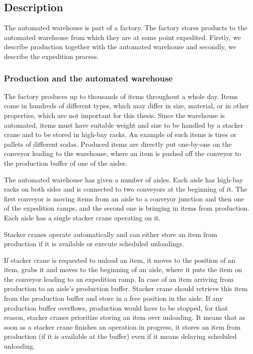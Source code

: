 \documentclass{ctuthesis}
\begin{document}
\subsection{Description}
\label{subsec:Description}
The automated warehouse is part of a factory. The factory stores products to the automated warehouse from which they are at some point expedited. Firstly, we describe production together with the automated warehouse and secondly, we describe the expedition process.

\subsubsection{Production and the automated warehouse}

The factory produces up to thousands of items throughout a whole day. Items come in hundreds of different types, which may differ in size, material, or in other properties, which are not important for this thesis. Since the warehouse is automated, items must have suitable weight and size to be handled by a stacker crane and to be stored in high-bay racks. An example of such items is tires or pallets of different sodas. Produced items are directly put one-by-one on the conveyor leading to the warehouse, where an item is pushed off the conveyor to the production buffer of one of the aisles.

The automated warehouse has given a number of aisles. Each aisle has high-bay racks on both sides and is connected to two conveyors at the beginning of it. The first conveyor is moving items from an aisle to a conveyor junction and then one of the expedition ramps, and the second one is bringing in items from production. Each aisle has a single stacker crane operating on it.

Stacker cranes operate automatically and can either store an item from production if it is available or execute scheduled unloadings. 

If stacker crane is requested to unload an item, it moves to the position of an item, grabs it and moves to the beginning of an aisle, where it puts the item on the conveyor leading to an expedition ramp. In case of an item arriving from production to an aisle's production buffer. Stacker crane should retrieve this item from the production buffer and store in a free position in the aisle. If any production buffer overflows, production would have to be stopped, for that reason, stacker cranes prioritize storing an item over unloading. It means that as soon as a stacker crane finishes an operation in progress, it stores an item from production (if it is available at the buffer) even if it means delaying scheduled unloading.
\end{document}
